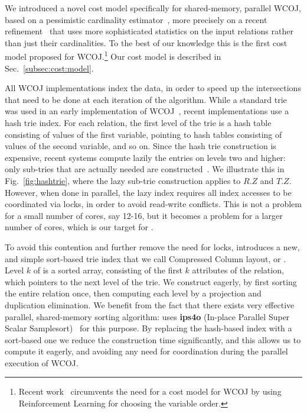 We introduced a novel cost model specifically for shared-memory,
parallel WCOJ, based on a pessimistic cardinality
estimator~\cite{DBLP:conf/sigmod/CaiBS19}, more precisely on a recent
refinement~\cite{DBLP:journals/pacmmod/KhamisNOS24} that uses more
sophisticated statistics on the input relations rather than just their
cardinalities.  To the best of our knowledge this is the first cost
model proposed for WCOJ.\footnote{Recent
  work~\cite{DBLP:journals/pvldb/WangT0O23} circumvents the need for a
  cost model for WCOJ by using Reinforcement Learning for choosing the
  variable order.}  Our cost model is described in
Sec.~\ref{subsec:cost:model}.


All WCOJ implementations index the data, in order to speed up the
intersections that need to be done at each iteration of the algorithm.
While a standard trie was used in an early implementation of
WCOJ~\cite{DBLP:conf/icdt/Veldhuizen14}, recent implementations use a
hash trie index.  For each relation, the first level of the trie is a
hash table consisting of values of the first variable, pointing to
hash tables consisting of values of the second variable, and so on.
Since the hash trie construction is expensive, recent systems compute
lazily the entries on levels two and higher: only sub-tries that are
actually needed are
constructed~\cite{DBLP:journals/pvldb/FreitagBSKN20,DBLP:journals/pacmmod/WangWS23}.
We illustrate this in Fig.~\ref{fig:hashtrie}, where the lazy sub-trie
construction applies to $R.Z$ and $T.Z$.  However, when done in
parallel, the lazy index requires all index accesses to be coordinated
via locks, in order to avoid read-write conflicts.  This is not a
problem for a small number of cores, say 12-16, but it becomes a
problem for a larger number of cores, which is our target for \name.

To avoid this contention and further remove the need for locks, \name
introduces a new, and simple sort-based trie index that we call
Compressed Column layout, or \indexlayout.  Level $k$ of \indexlayout
is a sorted array, consisting of the first $k$ attributes of the
relation, which pointers to the next level of the trie.  We construct
\indexlayout eagerly, by first sorting the entire relation once, then
computing each level by a projection and duplication elimination.  We
benefit from the fact that there exists very effective parallel,
shared-memory sorting algorithm: \name uses \textbf{ips4o} (In-place
Parallel Super Scalar Samplesort)~\cite{axtmann2017,
  axtmann2020engineering} for this purpose.  By replacing the
hash-based index with a sort-based one we reduce the construction time
significantly, and this allows us to compute it eagerly, and avoiding
any need for coordination during the parallel execution of
WCOJ. 

